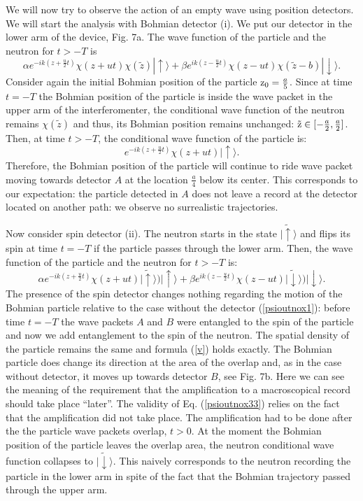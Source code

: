 \documentclass[preprint,tightenlines]{elsarticle}
\begin{document}
We will now try to observe the action of an empty wave using position
detectors. We will start the analysis with Bohmian detector (i). We
put our detector in the lower arm of the device, Fig. 7a. The wave
function of the particle and the neutron for $t>-T$ is
\begin{equation}
\alpha e^{-ik(z+\frac{u}{2}t)}\chi(z+ut)\chi(\tilde{z})|\uparrow\rangle+\beta e^{ik(z-\frac{u}{2}t)}\chi(z-ut)\chi(\tilde{z}-b)|\downarrow\rangle.\label{psioutnox2}
\end{equation}
 Consider again the initial Bohmian position of the particle ${\rm z_{0}}=\frac{a}{5}$.
Since at time $t=-T$ the Bohmian position of the particle is inside
the  wave packet in the upper arm of the interferomenter, the conditional wave function of the neutron
remains $\chi(\tilde{z})$ and thus, its Bohmian position remains
unchanged: ${\rm \tilde{z}}\in[-\frac{a}{2},\frac{a}{2}]$. Then,
at time $t>-T$, the conditional wave function of the particle is:
\begin{equation}
e^{-ik(z+\frac{u}{2}t)}\chi(z+ut)|\uparrow\rangle.\label{psiout55}
\end{equation}
 Therefore, the Bohmian position of the particle will continue to
ride wave packet moving towards detector $A$ at the location $\frac{a}{4}$ below its center. This corresponds to our expectation: the particle
detected in $A$ does not leave a record at the detector located on
another path: we observe no surrealistic trajectories.


Now consider spin detector (ii). The neutron starts in the state $|\tilde{\uparrow}\rangle$ and
flips its spin at time $t=-T$ if the particle passes through the lower arm. Then, the wave function of the particle and the neutron for
$t>-T$ is:
 \begin{equation}
\alpha e^{-ik(z+\frac{u}{2}t)}\chi(z+ut)|\tilde{\uparrow}\rangle)|\uparrow\rangle+\beta e^{ik(z-\frac{u}{2}t)}\chi(z-ut)|\tilde{\downarrow}\rangle)|\downarrow\rangle.\label{psioutnox33}
\end{equation}
 The presence of the spin detector changes nothing regarding the motion
of the Bohmian particle relative to the case without the detector (\ref{psioutnox1}):
before time $t=-T$ the wave packets $A$ and $B$ were entangled
to the spin of the particle and now we add entanglement to the spin
of the neutron. The spatial density of the particle remains the same
and formula (\ref{v}) holds exactly. The Bohmian particle does change
its direction at the area of the overlap and, as in
the case without detector, it moves up towards
detector $B$, see Fig. 7b.  Here we can see the meaning of the requirement that the amplification to a macroscopical record should take place ``later''. The validity of Eq. (\ref{psioutnox33}) relies on the fact that the amplification did not take place. The amplification had to be done after the   the particle wave packets overlap,  $t>0$. At the moment the Bohmian position of the particle leaves the overlap area, 
the neutron conditional wave function collapses to $|\tilde{\downarrow}\rangle$. This naively corresponds to the neutron recording the particle in 
the lower arm in spite of the fact that the Bohmian trajectory passed through the
upper arm.
\end{document}

